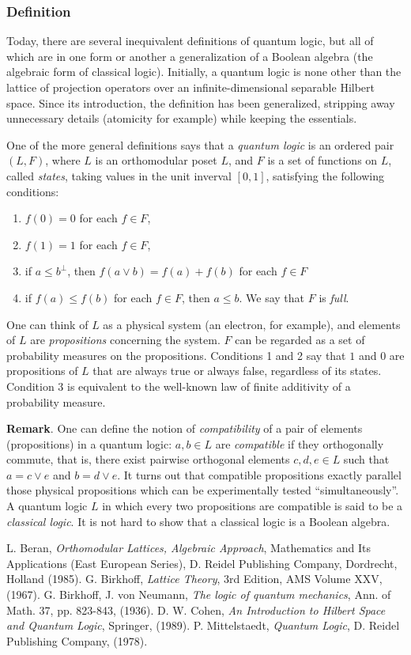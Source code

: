 \documentclass[12pt]{article}
\begin{document}
\subsubsection*{Definition}
Today, there are several inequivalent definitions of quantum logic, but all of which are in one form or another a generalization of a Boolean algebra (the algebraic form of classical logic).   Initially, a quantum logic is none other than the lattice of projection operators over an infinite-dimensional separable Hilbert space.  Since its introduction, the definition has been generalized, stripping away unnecessary details (atomicity for example) while keeping the essentials.

One of the more general definitions says that a \emph{quantum logic} is an ordered pair $(L,F)$, where $L$ is an orthomodular poset $L$, and $F$ is a set of functions on $L$, called \emph{states}, taking values in the unit inverval $[0,1]$, satisfying the following conditions:
\begin{enumerate}
\item $f(0)=0$ for each $f\in F$,
\item $f(1)=1$ for each $f\in F$,
\item if $a\le b^{\perp}$, then $f(a\vee b)=f(a)+f(b)$ for each $f\in F$
\item if $f(a)\le f(b)$ for each $f\in F$, then $a\le b$.  We say that $F$ is \emph{full}.
\end{enumerate}
One can think of $L$ as a physical system (an electron, for example), and elements of $L$ are \emph{propositions} concerning the system.  $F$ can be regarded as a set of probability measures on the propositions.  Conditions 1 and 2 say that $1$ and $0$ are propositions of $L$ that are always true or always false, regardless of its states.  Condition 3 is equivalent to the well-known law of finite additivity of a probability measure.

\textbf{Remark}.  One can define the notion of \emph{compatibility} of a pair of elements (propositions) in a quantum logic: $a,b\in L$ are \emph{compatible} if they orthogonally commute, that is, there exist pairwise orthogonal elements $c,d,e\in L$ such that $a=c\vee e$ and $b=d\vee e$.  It turns out that compatible propositions exactly parallel those physical propositions which can be experimentally tested ``simultaneously''.  A quantum logic $L$ in which every two propositions are compatible is said to be a \emph{classical logic}.  It is not hard to show that a classical logic is a Boolean algebra.

\begin{thebibliography}{8}
 L. Beran, {\em Orthomodular Lattices, Algebraic Approach}, Mathematics and Its Applications (East European Series), D. Reidel Publishing Company, Dordrecht, Holland (1985).
 G. Birkhoff, {\em Lattice Theory}, 3rd Edition, AMS Volume XXV, (1967).
 G. Birkhoff, J. von Neumann, {\em The logic of quantum mechanics}, Ann. of Math. 37, pp. 823-843, (1936).
 D. W. Cohen, {\em An Introduction to Hilbert Space and Quantum Logic}, Springer, (1989).
 P. Mittelstaedt, {\em Quantum Logic}, D. Reidel Publishing Company, (1978).
\end{thebibliography}

\end{document}

